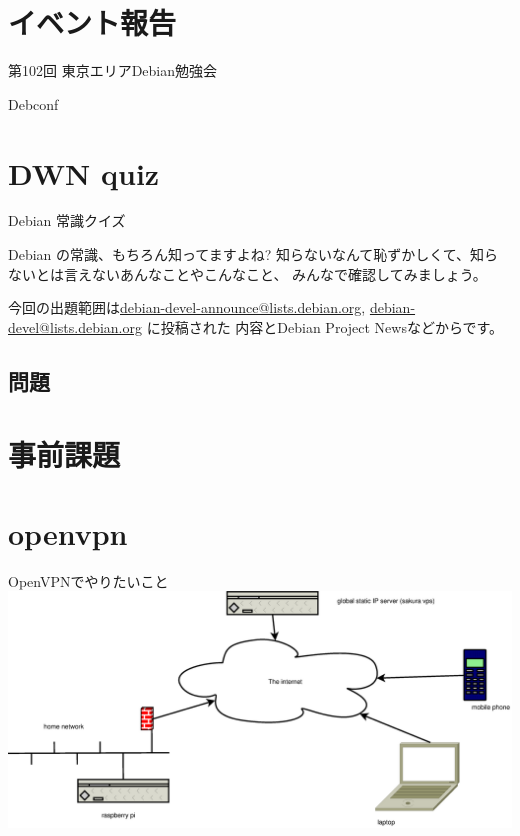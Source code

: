 \section{イベント報告}

\begin{frame}{第102回 東京エリアDebian勉強会}
\end{frame}

\begin{frame}{Debconf}
\end{frame}

\section{DWN quiz}
\begin{frame}{Debian 常識クイズ}

  Debian の常識、もちろん知ってますよね?
知らないなんて恥ずかしくて、知らないとは言えないあんなことやこんなこと、
みんなで確認してみましょう。

今回の出題範囲は\url{debian-devel-announce@lists.debian.org},
\url{debian-devel@lists.debian.org} に投稿された
内容とDebian Project Newsなどからです。

\end{frame}

\subsection{問題}
 

\section{事前課題}

{\footnotesize
 
}

\section{openvpn}

\begin{frame}{OpenVPNでやりたいこと}
  \includegraphics[width=0.9\hsize]{image201308/network.eps}
\end{frame}

